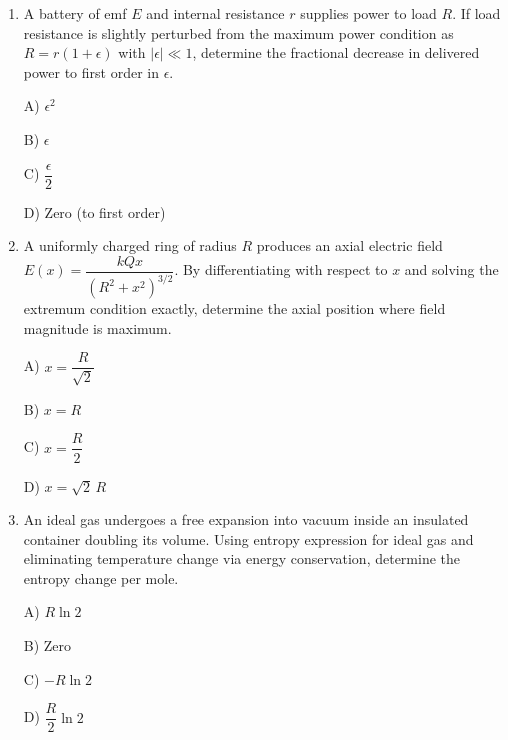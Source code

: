 \documentclass[12pt]{article}
\begin{document}
\begin{enumerate}[leftmargin=*]
D) Decreases by factor $1/k^2$

\item A battery of emf $E$ and internal resistance $r$ supplies power to load $R$. If load resistance is slightly perturbed from the maximum power condition as $R=r(1+\epsilon)$ with $|\epsilon|\ll1$, determine the fractional decrease in delivered power to first order in $\epsilon$.

A) $\epsilon^2$

B) $\epsilon$

C) $\dfrac{\epsilon}{2}$

D) Zero (to first order)

\item A uniformly charged ring of radius $R$ produces an axial electric field $E(x)=\dfrac{kQx}{(R^2+x^2)^{3/2}}$. By differentiating with respect to $x$ and solving the extremum condition exactly, determine the axial position where field magnitude is maximum.


\begin{center}
\end{center}

A) $x=\dfrac{R}{\sqrt2}$

B) $x=R$

C) $x=\dfrac{R}{2}$

D) $x=\sqrt2\,R$

\item An ideal gas undergoes a free expansion into vacuum inside an insulated container doubling its volume. Using entropy expression for ideal gas and eliminating temperature change via energy conservation, determine the entropy change per mole.

A) $R\ln2$

B) Zero

C) $-R\ln2$

D) $\dfrac{R}{2}\ln2$


\end{enumerate}
\end{document}
